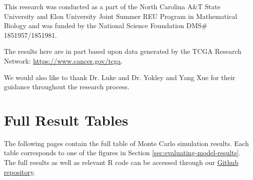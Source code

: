 \documentclass{article}
\begin{document}
	This research was conducted as a part of the North Carolina A\&T State University and Elon University Joint Summer REU Program in Mathematical Biology and was funded by the National Science Foundation DMS\# 1851957/1851981.
	
	The results here are in part based upon data generated by the TCGA Research Network: \href{https://www.cancer.gov/tcga}{https://www.cancer.gov/tcga}.
	
	We would also like to thank Dr. Luke and Dr. Yokley and Yang Xue for their guidance throughout the research process.
	
	\newpage
	
	
	
	\newpage
	\appendix
	\section{Full Result Tables}\label{app:full-results}
	The following pages contain the full table of Monte Carlo simulation results. Each table corresponds to one of the figures in Section \ref{sec:evaluating-model-results}. The full results as well as relevant R code can be accessed through our \href{https://github.com/connor-shrader/reu-2021}{Github repository}.
	
	\setlength{\tabcolsep}{3pt}
	
\end{document}
